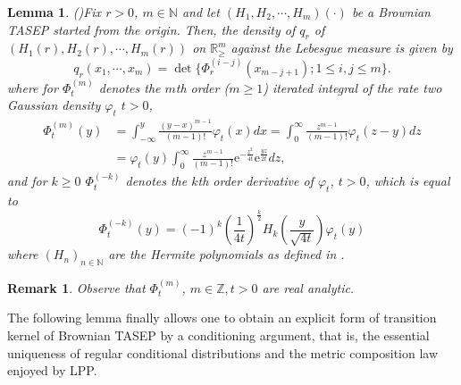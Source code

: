 \documentclass[11pt, reqno]{amsart}
\numberwithin{equation}{section}
\newcounter{dummy} \numberwithin{dummy}{section}
\newtheorem{lemma}[dummy]{Lemma}
\newtheorem*{remark}{Remark}
\newcommand{\N}{\ensuremath{\mathbb{N}}}
\newcommand{\R}{\ensuremath{\mathbb{R}}}
\newcommand{\Z}{\ensuremath{\mathbb{Z}}}
\begin{document}
\begin{lemma}(\cite[Proposition 8]{warren2007dyson})\label{lemma: density Warren} Fix $r>0$, $m\in \N$ and let $(H_1, H_2, \cdots, H_m)(\cdot)$ be a Brownian TASEP started from the origin. Then, the density of  $q_r$ of $(H_1(r), H_{2}(r), \cdots, H_m (r))$ on $\R^m_\ge$ against the Lebesgue measure is given by
\begin{equation*}
    q_r(x_1, \cdots, x_m) = \det \bigl\{ \Phi_r^{(i-j)}(x_{m-j+1}); 1 \leq i,j \leq m \bigr\}.
\end{equation*}
where for $\Phi^{(m)}_t$ denotes the $m$th order ($m\ge 1$) iterated integral of the rate two Gaussian density $\varphi_t$ $t>0$,
\begin{equation*}
\begin{array}{cc}
      \Phi^{(m)}_t(y) & = \displaystyle\int_{-\infty}^y \frac{(y-x)^{m-1}}{(m-1)!} \varphi_t(x)dx = \int_0^\infty \frac{z^{m-1}}{(m-1)!} \varphi_t(z-y)dz \\
     & = \displaystyle\varphi_t(y)\int_0^\infty \frac{z^{m-1}}{(m-1)!} \mathrm{e}^{-\frac{z^2}{4t}}\mathrm{e}^{\frac{yz}{2t}}dz,
\end{array}
\end{equation*}
and for $k \geq 0 $ $\Phi^{(-k)}_t$ denotes the $k$th order derivative of $\varphi_t$, $t > 0$, which is equal to
\begin{equation*}
    \Phi^{(-k)}_t(y) = (-1)^k \left(\frac{1}{4t}\right)^{\frac{k}{2}}H_k\left(\frac{y}{\sqrt{4t}}\right) \varphi_t (y)
\end{equation*}
where $(H_n)_{n\in \N}$ are the Hermite polynomials as defined in \cite{weisstein2002hermite}.
\end{lemma}

\begin{remark}
    Observe that $\Phi^{(m)}_t$, $m\in \Z, t>0$ are real analytic. 
\end{remark}

The following lemma finally allows one to obtain an explicit form of transition kernel of Brownian TASEP by a conditioning argument, that is, the essential uniqueness of regular conditional distributions and the metric composition law enjoyed by LPP.
\end{document}

